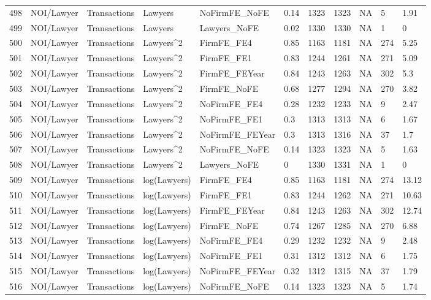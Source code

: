 \documentclass{article}
\begin{document}
\begin{table}[H]
\begin{tabular}{rllllllllll}
  498 & NOI/Lawyer & Transactions & Lawyers & NoFirmFE\_NoFE & 0.14 & 1323 & 1323 & NA & 5 & 1.91 \\
  499 & NOI/Lawyer & Transactions & Lawyers & Lawyers\_NoFE & 0.02 & 1330 & 1330 & NA & 1 & 0 \\
  500 & NOI/Lawyer & Transactions & Lawyers^2 & FirmFE\_FE4 & 0.85 & 1163 & 1181 & NA & 274 & 5.25 \\
  501 & NOI/Lawyer & Transactions & Lawyers^2 & FirmFE\_FE1 & 0.83 & 1244 & 1261 & NA & 271 & 5.09 \\
  502 & NOI/Lawyer & Transactions & Lawyers^2 & FirmFE\_FEYear & 0.84 & 1243 & 1263 & NA & 302 & 5.3 \\
  503 & NOI/Lawyer & Transactions & Lawyers^2 & FirmFE\_NoFE & 0.68 & 1277 & 1294 & NA & 270 & 3.82 \\
  504 & NOI/Lawyer & Transactions & Lawyers^2 & NoFirmFE\_FE4 & 0.28 & 1232 & 1233 & NA & 9 & 2.47 \\
  505 & NOI/Lawyer & Transactions & Lawyers^2 & NoFirmFE\_FE1 & 0.3 & 1313 & 1313 & NA & 6 & 1.67 \\
  506 & NOI/Lawyer & Transactions & Lawyers^2 & NoFirmFE\_FEYear & 0.3 & 1313 & 1316 & NA & 37 & 1.7 \\
  507 & NOI/Lawyer & Transactions & Lawyers^2 & NoFirmFE\_NoFE & 0.14 & 1323 & 1323 & NA & 5 & 1.63 \\
  508 & NOI/Lawyer & Transactions & Lawyers^2 & Lawyers\_NoFE & 0 & 1330 & 1331 & NA & 1 & 0 \\
  509 & NOI/Lawyer & Transactions & log(Lawyers) & FirmFE\_FE4 & 0.85 & 1163 & 1181 & NA & 274 & 13.12 \\
  510 & NOI/Lawyer & Transactions & log(Lawyers) & FirmFE\_FE1 & 0.83 & 1244 & 1262 & NA & 271 & 10.63 \\
  511 & NOI/Lawyer & Transactions & log(Lawyers) & FirmFE\_FEYear & 0.84 & 1243 & 1263 & NA & 302 & 12.74 \\
  512 & NOI/Lawyer & Transactions & log(Lawyers) & FirmFE\_NoFE & 0.74 & 1267 & 1285 & NA & 270 & 6.88 \\
  513 & NOI/Lawyer & Transactions & log(Lawyers) & NoFirmFE\_FE4 & 0.29 & 1232 & 1232 & NA & 9 & 2.48 \\
  514 & NOI/Lawyer & Transactions & log(Lawyers) & NoFirmFE\_FE1 & 0.31 & 1312 & 1312 & NA & 6 & 1.75 \\
  515 & NOI/Lawyer & Transactions & log(Lawyers) & NoFirmFE\_FEYear & 0.32 & 1312 & 1315 & NA & 37 & 1.79 \\
  516 & NOI/Lawyer & Transactions & log(Lawyers) & NoFirmFE\_NoFE & 0.14 & 1323 & 1323 & NA & 5 & 1.74 \\

\end{tabular}
\end{table}
\end{document}
